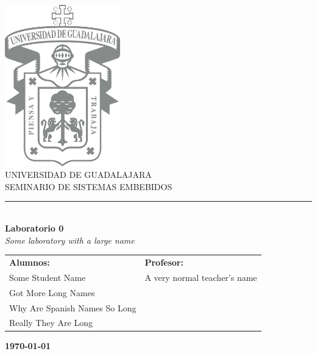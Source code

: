 \documentclass[12pt]{article}
\newcommand{\experimentname}{Some laboratory with a large name}
\newcommand{\experimentnumber}{0}
\newcommand{\subjectname}{SEMINARIO DE SISTEMAS EMBEBIDOS}
\newcommand{\teamnamesone}{Some Student Name}
\newcommand{\teamnamestwo}{Got More Long Names}
\newcommand{\teamnamesthree}{Why Are Spanish Names So Long}
\newcommand{\teamnamesfour}{Really They Are Long}
\newcommand{\professorname}{A very normal teacher's name}
\begin{document}
    \begin{titlepage}
        \begin{center}
            \includegraphics[width=5cm]{data/private_img/udg-logo.png}\\
            \vspace{1.2cm}
            \huge{UNIVERSIDAD DE GUADALAJARA}\\
            \Large{\subjectname}\\
            \rule{16cm}{0.8pt}\\
            \vspace{0.7cm}
            \Large{\textbf{Laboratorio \experimentnumber}\\\LARGE{\textit{\experimentname}}}
        \end{center}
        \vspace{1cm}
        \begin{center}
            \begin{tabular}{p{8cm}p{6cm}}
                \textbf{Alumnos:} & \textbf{Profesor:}\\
                \teamnamesone & \professorname\\
                \teamnamestwo & \\
                \teamnamesthree & \\
                \teamnamesfour & 
            \end{tabular}
        \end{center}
        \vspace{3.1416cm}
        \begin{center}
            \textbf{\large{\today}}
        \end{center}
        
        
    \end{titlepage}
    \newpage
   
    
\end{document}
